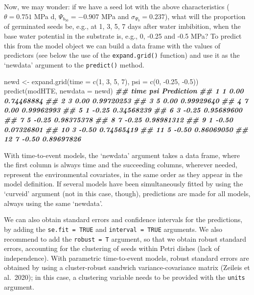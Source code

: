 \documentclass[
]{book}
\newenvironment{Shaded}{\begin{snugshade}}{\end{snugshade}}
\newcommand{\AttributeTok}[1]{\textcolor[rgb]{0.77,0.63,0.00}{#1}}
\newcommand{\DecValTok}[1]{\textcolor[rgb]{0.00,0.00,0.81}{#1}}
\newcommand{\DocumentationTok}[1]{\textcolor[rgb]{0.56,0.35,0.01}{\textbf{\textit{#1}}}}
\newcommand{\FloatTok}[1]{\textcolor[rgb]{0.00,0.00,0.81}{#1}}
\newcommand{\FunctionTok}[1]{\textcolor[rgb]{0.00,0.00,0.00}{#1}}
\newcommand{\NormalTok}[1]{#1}
\newcommand{\OtherTok}[1]{\textcolor[rgb]{0.56,0.35,0.01}{#1}}
\newcommand{\SpecialCharTok}[1]{\textcolor[rgb]{0.00,0.00,0.00}{#1}}
\begin{document}
Now, we may wonder: if we have a seed lot with the above characteristics (\(\theta = 0.751\) MPa d, \(\Psi_{b_{50}} = -0.907\) MPa and \(\sigma_{\Psi_b} = 0.237\)), what will the proportion of germinated seeds be, e.g., at 1, 3, 5, 7 days after water imbibition, when the base water potential in the substrate is, e.g., 0, -0.25 and -0.5 MPa? To predict this from the model object we can build a data frame with the values of predictors (see below the use of the \texttt{expand.grid()} function) and use it as the `newdata' argument to the \texttt{predict()} method.

\begin{Shaded}
\begin{Highlighting}[]
\NormalTok{newd }\OtherTok{\textless{}{-}} \FunctionTok{expand.grid}\NormalTok{(}\AttributeTok{time =} \FunctionTok{c}\NormalTok{(}\DecValTok{1}\NormalTok{, }\DecValTok{3}\NormalTok{, }\DecValTok{5}\NormalTok{, }\DecValTok{7}\NormalTok{), }
                    \AttributeTok{psi =} \FunctionTok{c}\NormalTok{(}\DecValTok{0}\NormalTok{, }\SpecialCharTok{{-}}\FloatTok{0.25}\NormalTok{, }\SpecialCharTok{{-}}\FloatTok{0.5}\NormalTok{))}
\FunctionTok{predict}\NormalTok{(modHTE, }\AttributeTok{newdata =}\NormalTok{ newd)}
\DocumentationTok{\#\#    time   psi Prediction}
\DocumentationTok{\#\# 1     1  0.00 0.74468884}
\DocumentationTok{\#\# 2     3  0.00 0.99720253}
\DocumentationTok{\#\# 3     5  0.00 0.99929640}
\DocumentationTok{\#\# 4     7  0.00 0.99962993}
\DocumentationTok{\#\# 5     1 {-}0.25 0.34568239}
\DocumentationTok{\#\# 6     3 {-}0.25 0.95689600}
\DocumentationTok{\#\# 7     5 {-}0.25 0.98375378}
\DocumentationTok{\#\# 8     7 {-}0.25 0.98981312}
\DocumentationTok{\#\# 9     1 {-}0.50 0.07326801}
\DocumentationTok{\#\# 10    3 {-}0.50 0.74565419}
\DocumentationTok{\#\# 11    5 {-}0.50 0.86069050}
\DocumentationTok{\#\# 12    7 {-}0.50 0.89697826}
\end{Highlighting}
\end{Shaded}

With time-to-event models, the `newdata' argument takes a data frame, where the first column is always time and the succeeding columns, wherever needed, represent the environmental covariates, in the same order as they appear in the model definition. If several models have been simultaneously fitted by using the `curveid' argument (not in this case, though), predictions are made for all models, always using the same `newdata'.

We can also obtain standard errors and confidence intervals for the predictions, by adding the \texttt{se.fit\ =\ TRUE} and \texttt{interval\ =\ TRUE} arguments. We also recommend to add the \texttt{robust\ =\ T} argument, so that we obtain robust standard errors, accounting for the clustering of seeds within Petri dishes (lack of independence). With parametric time-to-event models, robust standard errors are obtained by using a cluster-robust sandwich variance-covariance matrix (Zeileis et al.~2020); in this case, a clustering variable needs to be provided with the \texttt{units} argument.
\end{document}
